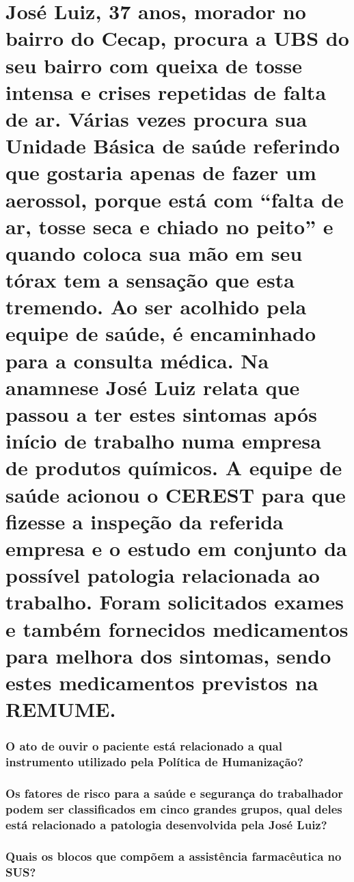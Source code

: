 \documentclass[11pt,notitlepage]{article}
\title{\vspace{-5ex}}
\date{\vspace{-5ex}}
\author{}
\begin{document}

\maketitle %

\part{José Luiz, 37 anos, morador no bairro do Cecap, procura a UBS do seu bairro com queixa de tosse intensa e crises repetidas de falta de ar. Várias vezes procura sua Unidade Básica de saúde  referindo que gostaria apenas de fazer um aerossol, porque está com “falta de ar, tosse seca e chiado no peito” e quando coloca sua mão em seu tórax tem a sensação que esta tremendo. Ao ser acolhido pela equipe de saúde, é encaminhado para a consulta médica. Na anamnese José Luiz relata que passou a ter estes sintomas após início de trabalho numa empresa de produtos químicos. A equipe de saúde acionou o CEREST para que fizesse a inspeção da referida empresa e o estudo em conjunto da possível patologia relacionada ao trabalho. Foram solicitados exames e também fornecidos medicamentos para melhora dos sintomas, sendo estes medicamentos previstos na REMUME.}
\vspace{0.5cm}

\section{O ato de ouvir o paciente está relacionado a qual instrumento utilizado pela Política de Humanização?}
\noindent\makebox[\linewidth]{\rule{\textwidth}{0.5pt}}
\noindent\makebox[\linewidth]{\rule{\textwidth}{0.5pt}}
\vspace{0.5cm}

\section{Os fatores de risco para a saúde e segurança do trabalhador podem ser classificados em cinco grandes grupos, qual deles está relacionado a patologia desenvolvida pela José Luiz?}
\noindent\makebox[\linewidth]{\rule{\textwidth}{0.5pt}}
\noindent\makebox[\linewidth]{\rule{\textwidth}{0.5pt}}
\vspace{0.5cm}

\section{Quais os blocos que compõem a assistência farmacêutica no SUS?}
\noindent\makebox[\linewidth]{\rule{\textwidth}{0.5pt}}
\noindent\makebox[\linewidth]{\rule{\textwidth}{0.5pt}}
\noindent\makebox[\linewidth]{\rule{\textwidth}{0.5pt}}
\vspace{0.5cm}
\end{document}
